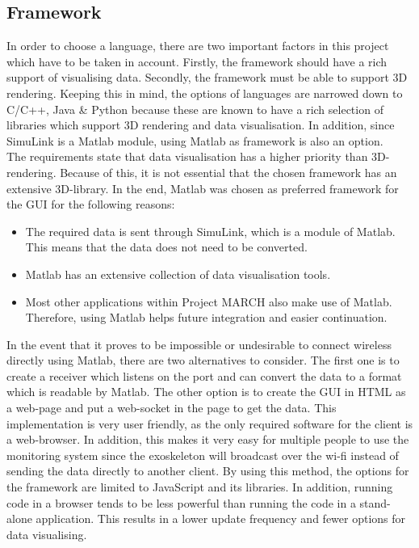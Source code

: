 \subsection{Framework}
In order to choose a language, there are two important factors in this project which have to be taken in account. Firstly, the framework should have a rich support of visualising data. Secondly, the framework must be able to support 3D rendering. Keeping this in mind, the options of languages are narrowed down to C/C++, Java \& Python because these are known to have a rich selection of libraries which support 3D rendering and data visualisation. In addition, since SimuLink is a Matlab module, using Matlab as framework is also an option. \\
The requirements state that data visualisation has a higher priority than 3D-rendering. Because of this, it is not essential that the chosen framework has an extensive 3D-library. In the end, Matlab was chosen as preferred framework for the GUI for the following reasons:
\begin{itemize}
	\item The required data is sent through SimuLink, which is a module of Matlab. This means that the data does not need to be converted.
	\item Matlab has an extensive collection of data visualisation tools.
	\item Most other applications within Project MARCH also make use of Matlab. Therefore, using Matlab helps future integration and easier continuation.
\end{itemize}
In the event that it proves to be impossible or undesirable to connect wireless directly using Matlab, there are two alternatives to consider. The first one is to create a receiver which listens on the port and can convert the data to a format which is readable by Matlab. The other option is to create the GUI in HTML as a web-page and put a web-socket in the page to get the data. This implementation is very user friendly, as the only required software for the client is a web-browser. In addition, this makes it very easy for multiple people to use the monitoring system since the exoskeleton will broadcast over the wi-fi instead of sending the data directly to another client. By using this method, the options for the framework are limited to JavaScript and its libraries. In addition, running code in a browser tends to be less powerful than running the code in a stand-alone application. This results in a lower update frequency and fewer options for data visualising.

